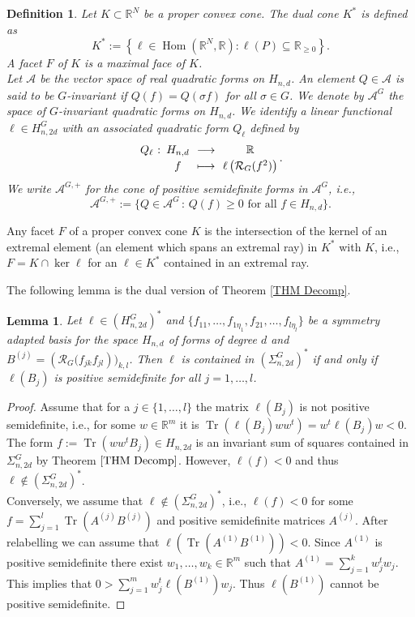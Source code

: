 \documentclass[11pt,a4paper]{amsart}
\newcommand{\abb}[5]{%
\setlength{\arraycolsep}{0.4ex}%
\begin{array}{rcccc}%
#1 &:\,& #2 & \,\,\longrightarrow\,\, & #3 \\[0.5ex]%
     & & #4 & \longmapsto & #5%
\end{array}%
}
\numberwithin{equation}{section}
\newtheorem{lemma}[thm]{Lemma}
\newtheorem{definition}[thm]{Definition}
\theoremstyle{definition}
\newcommand{\R}{\mathbb{R}}
\DeclareMathOperator{\Tr}{Tr}
\DeclareMathOperator{\Hom}{Hom}
\numberwithin{thm}{section}
\theoremstyle{break}
\numberwithin{subcase}{case}
\begin{document}
\begin{definition}
Let $K\subset\R^N$ be a proper convex cone. The dual cone $K^\ast$ is defined as $$K^\ast := \left\{ \ell \in \Hom \left( \R^N,\R\right) : \ell(P)\subseteq \R_{\geq 0}\right\}.$$ A facet $F$ of $K$ is  a maximal face of $K$.  \\
Let $\mathcal{A}$ be the vector space of real quadratic forms on $H_{n,d}$. An element $Q\in \mathcal{A}$ is said to be $G$-invariant if $Q(f)=Q(\sigma f)$ for all $\sigma \in G$. We denote by $\mathcal{A}^{G}$ the space of $G$-invariant quadratic forms on $H_{n,d}$. We identify a linear functional $\ell \in H_{n,2d}^{G}$ with an associated quadratic form $Q_{\ell}$ defined by $$\abb{Q_\ell}{H_{n,d}}{\R}{f}{\ell \left( \mathcal{R}_G(f^2)\right)}.$$ We write $\mathcal{A}^{G,+}$ for the cone of positive semidefinite forms in $\mathcal{A}^{G}$, i.e.,
$$\mathcal{A}^{G,+}:=\{Q\in \mathcal{A}^{G}\,:\, Q(f)\geq 0\text{ for all } f\in
H_{n,d}\}.$$
\end{definition}
Any facet $F$ of a proper convex cone $K$ is the intersection of the kernel of an extremal element (an element which spans an extremal ray) in $K^\ast$ with $K$, i.e., $F = K \cap \ker \ell$ for an $\ell \in K^\ast$ contained in an extremal ray.

The following lemma is the dual version of Theorem \ref{THM Decomp}.
\begin{lemma}\label{le:psd}\label{cor:DualSosCone}
Let $\ell \in \left(H_{n,2d}^G\right)^\ast$ and $\{f_{11},\ldots,f_{1\eta_1},f_{21},\ldots,f_{l \eta_l}\}$ be a symmetry adapted basis for the space $H_{n,d}$ of forms of degree $d$ and $B^{(j)} = \left( \mathcal{R}_G (f_{jk}f_{jl} \right))_{k,l}$. Then $\ell$ is contained in $\left( \Sigma_{n,2d}^G\right)^\ast$ if and only if $\ell (B_j)$ is positive semidefinite for all $j=1,\ldots,l$.
\end{lemma}
\begin{proof}
Assume that for a $ j \in \{1,\ldots,l\}$ the matrix $\ell(B_j)$ is not positive semidefinite, i.e., for some $w \in \R^m$ it is $\Tr (\ell(B_j)ww^t)=w^t \ell(B_j)w < 0$. The form $f := \Tr (ww^tB_j) \in H_{n,2d}$ is an invariant sum of squares contained in $\Sigma_{n,2d}^G$ by Theorem $\ref{THM Decomp}$. However, $\ell (f) < 0$ and thus $\ell \not\in \left( \Sigma_{n,2d}^G\right)^\ast$. \\
Conversely, we assume that $\ell \not\in \left( \Sigma_{n,2d}^G\right)^\ast$, i.e., $\ell (f) < 0$ for some $f = \sum_{j=1}^l\Tr(A^{(j)}B^{(j)})$ and positive semidefinite matrices $A^{(j)}$. After relabelling we can assume that $ \ell \left( \Tr (A^{(1)}B^{(1)})\right) < 0$. Since $A^{(1)}$ is positive semidefinite there exist $w_1,\ldots,w_k \in \R^m$ such that $A^{(1)} = \sum_{j=1}^kw_j^tw_j.$ This implies that $0 > \sum_{j=1}^m w_j^t\ell(B^{(1)})w_j$. Thus $\ell(B^{(1)})$ cannot be positive semidefinite.
\end{proof}
\end{document}
